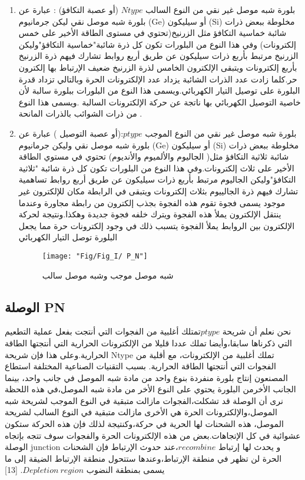	\begin{enumerate}
		
		\item   بلورة شبه موصل غير نقي من النوع السالب 
		$ N type $ (أو عصبة التكافؤ) :
		عبارة عن بلورة شبه موصل نقي  ليكن جرمانيوم (Ge) أو سيليكون (Si) مخلوطة ببعض ذرات شائبة خماسية التكافؤ مثل الزرنيخ(تحتوي في مستوى الطاقة الأخير على خمس إلكترونات) وفي هذا النوع من البلورات تكون كل ذرة شائبة"خماسية التكافؤ"وليكن الزرنيخ مرتبط بأربع ذرات سيليكون عن طريق أربع روابط تشارك فيهم ذرة الزرنيخ بأربع إلكترونات ويتبقى الإلكترون الخامس لذرة الزرنيخ ضعيف الإرتباط بها إلكترون حر.كلما زادت عدد الذرات الشائبة يزداد عدد الإلكترونات الحرة وبالتالي تزداد قدرة البلورة على توصيل التيار الكهربائي.ويسمى هذا النوع من البلورات ببلورة سالبة لأن خاصية التوصيل الكهربائي بها ناتجة عن حركة الإلكترونات السالبة .ويسمى هذا النوع من ذرات الشوائب بالذرات المانحة .
		
		\item    بلورة شبه موصل غير نقي من النوع الموجب
		$ p type $:(أو عصبة التوصيل )  
		عبارة عن بلورة شبه موصل نقي  وليكن جرمانيوم (Ge) أو سيليكون (Si) مخلوطة ببعض ذرات شائبة ثلاثية التكافؤ مثل( الجاليوم والألميوم والأنديوم) تحتوي في مستوي الطاقة الأخير على ثلاث إلكترونات.وفي هذا النوع من البلورات تكون كل ذرة شائبة "ثلاثية التكافؤ"وليكن الجاليوم مرتبط بأربع ذرات سيليكون عن طريق أربع روابط تساهمية تشارك فيهم ذرة الجالييوم بثلاث إلكترونات ويتبقى في الرابطة مكان للإلكترون غير موجود يسمى فجوة تقوم هذه الفجوة  بجذب إلكترون من رابطة مجاورة وعندما ينتقل الإلكترون يملأ هذه الفجوة ويترك خلفه فجوة جديدة وهكذا.ونتيجة لحركة الإلكترون بين الروابط يملأ الفجوة يتسبب ذلك في وجود إلكترونات حرة مما يجعل البلورة توصل التيار الكهربائي 
	 \cite{a10}
		
		\begin{figure}[h!]
			\centering
			\texttt{[image: "Fig/Fig\_I/ P\_N"]}
			\caption{شبه موصل موجب وشبه موصل سالب}
			\label{fig:-pn}
		\end{figure}
		\FloatBarrier	
		
	\end{enumerate} 
	\subsection{  الوصلة  PN}
	نحن نعلم أن شريحة $ p type $تمتلك أغلبية من الفجوات التي أنتجت بفعل عملية التطعيم التي ذكرناها سابقا،وأيضا تملك عددا قليلا من الإلكترونات الحرارية التي أنتجتها الطاقة الحرارية.وعلى هذا فإن شريحة Ntype تملك أغلبية من الإلكترونات، مع أقلية من الفجوات التي أنتجتها الطاقة الحرارية.
	بسبب التقنيات الصناعية المختلفة استطاع المصنعون إنتاج بلورة منفردة بنوع واحد من مادة شبه الموصل في جانب واحد، بينما الجانب الأخرمن البلورة يحتوي على النوع الأخر من مادة شبه الموصل،في هذه اللحظة نرى أن الوصلة قد تشكلت،الفجوات مازالت متبقية في النوع الموجب لشريحة شبه الموصل،والإلكترونات الحرة هي الأخرى مازالت متبقية في النوع السالب لشريحة الموصل، هذه الشحنات لها الحرية في حركة،وكنتيجة لذلك فإن هذه الحركة ستكون عشوائية في كل الإتجاهات.بعض من هذه الإلكترونات الحرة والفجوات سوف تتجه بإتجاه الوصلة junction و يحدث لها إرتباط $ recombine $،عند حدوث الإرتباط فإن الشحنات الحرة لن تظهر في منطقة الإرتباط،وعندها ستتحول منطقة الإرتباط الضيقة إلى ما يسمى بمنطقة النضوب $ Depletion ~region $.
	[13]

